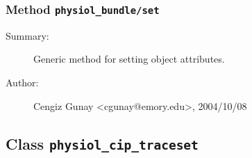 \subsubsection[Method \texttt{set}]{Method \texttt{physiol\_bundle/set}}%
%
\label{ref_physiol_bundle__set}%
\hypertarget{ref_physiol_bundle__set}{}%
\begin{description}
\item[Summary:]Generic method for setting object attributes.
%
%
%
%
%
%
%
\item[Author:]%
Cengiz Gunay <cgunay@emory.edu>, 2004/10/08
%
\end{description}
\methodline%
\subsection{Class \texttt{physiol\_cip\_traceset}}%
%
\label{ref_physiol_cip_traceset}%
\hypertarget{ref_physiol_cip_traceset}{}%
